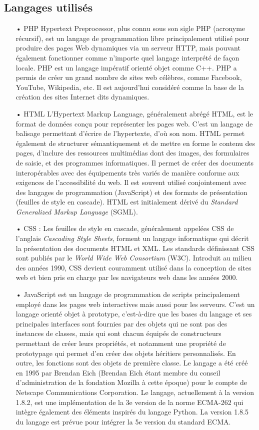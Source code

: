 	\subsection{Langages utilisés}
		\begin{itemize}
			\item[•]PHP
	Hypertext Preprocessor, plus connu sous son sigle PHP (acronyme récursif), est un langage de programmation libre principalement utilisé pour produire des pages Web dynamiques via un serveur HTTP, mais pouvant également fonctionner comme n'importe quel langage interprété de façon locale. PHP est un langage impératif orienté objet comme C++.
PHP a permis de créer un grand nombre de sites web célèbres, comme Facebook, YouTube, Wikipedia, etc. Il est aujourd'hui considéré comme la base de la création des sites Internet dits dynamiques.

			\item[•]HTML
			L’Hypertext Markup Language, généralement abrégé HTML, est le format de données conçu pour représenter les pages web. C’est un langage de balisage permettant d'écrire de l’hypertexte, d’où son nom. HTML permet également de structurer sémantiquement et de mettre en forme le contenu des pages, d'inclure des ressources multimédias dont des images, des formulaires de saisie, et des programmes informatiques. Il permet de créer des documents interopérables avec des équipements très variés de manière conforme aux exigences de l’accessibilité du web. Il est souvent utilisé conjointement avec des langages de programmation (JavaScript) et des formats de présentation (feuilles de style en cascade). HTML est initialement dérivé du \emph{Standard Generalized Markup Language} (SGML).
			\item[•]CSS :
			Les feuilles de style en cascade, généralement appelées CSS de l'anglais \emph{Cascading Style Sheets}, forment un langage informatique qui décrit la présentation des documents HTML et XML. Les standards définissant CSS sont publiés par le \emph{World Wide Web Consortium} (W3C). Introduit au milieu des années 1990, CSS devient couramment utilisé dans la conception de sites web et bien pris en charge par les navigateurs web dans les années 2000.
			\item[•]JavaScript 
			est un langage de programmation de scripts principalement employé dans les pages web interactives mais aussi pour les serveurs. C'est un langage orienté objet à prototype, c'est-à-dire que les bases du langage et ses principales interfaces sont fournies par des objets qui ne sont pas des instances de classes, mais qui sont chacun équipés de constructeurs permettant de créer leurs propriétés, et notamment une propriété de prototypage qui permet d'en créer des objets héritiers personnalisés. En outre, les fonctions sont des objets de première classe.
Le langage a été créé en 1995 par Brendan Eich (Brendan Eich étant membre du conseil d'administration de la fondation Mozilla à cette époque) pour le compte de Netscape Communications Corporation. Le langage, actuellement à la version 1.8.2, est une implémentation de la 3e version de la norme ECMA-262 qui intègre également des éléments inspirés du langage Python. La version 1.8.5 du langage est prévue pour intégrer la 5e version du standard ECMA.


\end{itemize}
